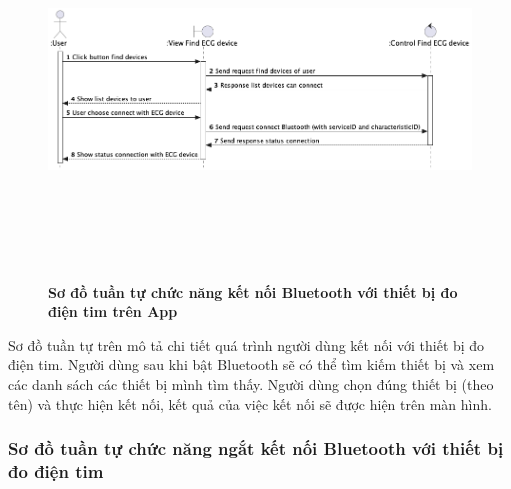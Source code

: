   \begin{figure}[H]
        \centering
        \includegraphics[width=16cm,height=10cm]{Images/mobile_app/connect_with_device.png}
        \caption[Sơ đồ tuần tự chức năng kết nối Bluetooth với thiết bị đo điện tim trên App]{\bfseries \fontsize{12pt}{0pt}
        \selectfont Sơ đồ tuần tự chức năng kết nối Bluetooth với thiết bị đo điện tim trên App}
        \label{connect_with_device} %
  \end{figure}

  Sơ đồ tuần tự trên mô tả chi tiết quá trình người dùng kết nối với thiết bị đo điện tim. Người dùng sau khi bật Bluetooth
  sẽ có thể tìm kiếm thiết bị và xem các danh sách các thiết bị mình tìm thấy. Người dùng chọn đúng thiết bị (theo tên) 
  và thực hiện kết nối, kết quả của việc kết nối sẽ được hiện trên màn hình.

\subsubsection{Sơ đồ tuần tự chức năng ngắt kết nối Bluetooth với thiết bị đo điện tim}
\mbox{}

